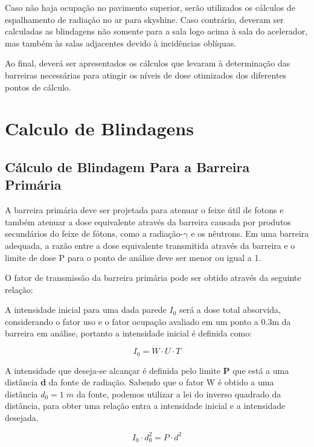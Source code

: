\documentclass[11pt,a4paper]{article}
\begin{document}
            Caso não haja ocupação no pavimento superior, serão utilizados os cálculos de espalhamento de radiação no ar para skyshine. Caso contrário, deveram ser calculadas as blindagens não somente para a sala logo acima à sala do acelerador, mas também às salas adjacentes devido à incidências oblíquas.

            Ao final, deverá ser apresentados os cálculos que levaram à determinação das barreiras necessárias para atingir os níveis de dose otimizados dos diferentes pontos de cálculo.

    \section{Calculo de Blindagens}

        \subsection{Cálculo de Blindagem Para a Barreira Primária}
            
            A barreira primária deve ser projetada para atenuar o feixe útil de fotons e também atenuar a dose equivalente através da barreira causada por produtos secundários do feixe de fótons, como a radiação-$\mathrm{\gamma}$ e os nêutrons. Em uma barreira adequada, a razão entre a dose equivalente transmitida através da barreira e o limite de dose P para o ponto de análise deve ser menor ou igual a 1.


            O fator de transmissão da barreira primária pode ser obtido através da seguinte relação:

            A intensidade inicial para uma dada parede $I_0$ será a dose total absorvida, considerando o fator uso e o fator ocupação avaliado em um ponto a 0.3m da barreira em análise, portanto a intensidade inicial é definida como:
            
            \begin{equation}
                I_0 = W \cdot U \cdot T
            \end{equation}

            A intensidade que deseja-se alcançar é definida pelo limite \textbf{P} que está a uma distância \textbf{d} da fonte de radiação. Sabendo que o fator W é obtido a uma distância $d_0 = 1 \; m$ da fonte, podemos utilizar a lei do inverso quadrado da distância, para obter uma relação entra a intensidade inicial e a intensidade desejada. 

            
                $$I_0 \cdot d_0^2 = P \cdot d^2$$
            
\end{document}
